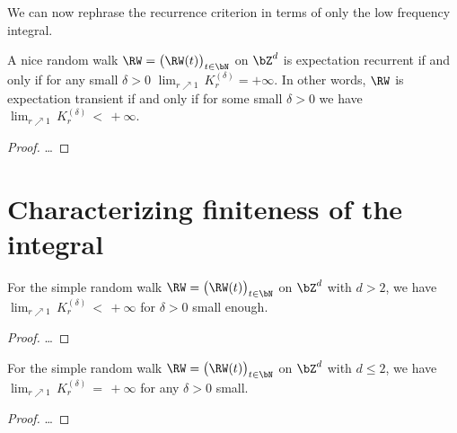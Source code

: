 We can now rephrase the recurrence criterion in terms of only the low frequency integral.

\begin{lemma}
  \label{lem:recurrence_iff_finite_low_frequency}
  A nice random walk $\RW = \big(\RW(t)\big)_{t \in \bN}$ on $\bZ^d$
  is expectation recurrent if and only if for any small $\delta>0$
  $\lim_{r \nearrow 1} \, K_r^{(\delta)} = +\infty$.
  In other words, $\RW$ is expectation transient if and only if
  for some small $\delta>0$ we have $\lim_{r \nearrow 1} \, K_r^{(\delta)} \, < \, +\infty$.
\end{lemma}
\begin{proof}
\ldots
\end{proof}


\section{Characterizing finiteness of the integral}

\begin{lemma}
  \label{lem:SRW_low_frequency_convergence}
  For the simple random walk $\RW = \big(\RW(t)\big)_{t \in \bN}$ on $\bZ^d$
  with $d > 2$,
  we have $\lim_{r \nearrow 1} \, K_r^{(\delta)} \, < \, +\infty$
  for $\delta > 0$ small enough.
\end{lemma}
\begin{proof}
\ldots
\end{proof}

\begin{lemma}
  \label{lem:SRW_low_frequency_divergence}
  For the simple random walk $\RW = \big(\RW(t)\big)_{t \in \bN}$ on $\bZ^d$
  with $d \le 2$,
  we have $\lim_{r \nearrow 1} \, K_r^{(\delta)} \, = \, +\infty$
  for any $\delta > 0$ small.
\end{lemma}
\begin{proof}
\ldots
\end{proof}
